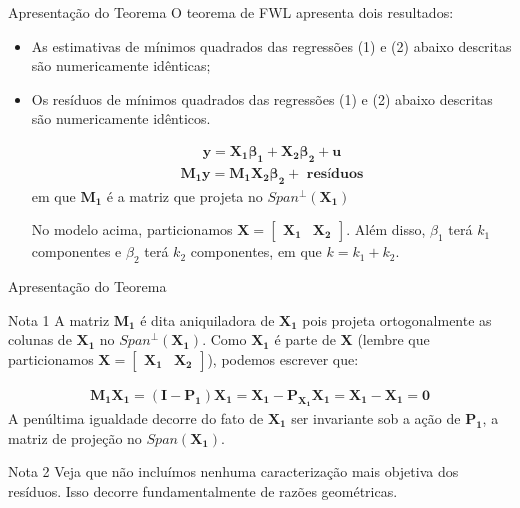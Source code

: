 \documentclass[11pt]{beamer}
\begin{document}
\begin{frame}{Apresentação do Teorema}
O teorema de FWL apresenta dois resultados:

\begin{itemize}

	\item As estimativas de m\'inimos quadrados das regress\~oes (1) e (2) abaixo descritas s\~ao numericamente id\^enticas;

	\item Os res\'iduos de m\'inimos quadrados das regress\~oes (1) e (2) abaixo descritas s\~ao numericamente id\^enticos.

\begin{align}
	\mathbf{y = X_1 \beta_1 + X_2 \beta_2 + u} 
\end{align} 
\begin{align}
	\mathbf{M_1y = M_1 X_2 \beta_2 +}  \textbf{ res\'iduos}
\end{align} 
em que $ \mathbf{M_1} $ \'e a matriz que projeta no $ Span^{\perp}(\mathbf{X_1}) $

No modelo acima, particionamos $ \mathbf{X} = \begin{bmatrix} \mathbf{X_1} & \mathbf{X_2} \end{bmatrix} $. Além disso, $ \beta_1 $ ter\'a $k_1$ componentes e $ \beta_2 $ ter\'a $k_2$ componentes, em que $ k = k_1 + k_2 $. 

\end{itemize}




\end{frame}

\begin{frame}{Apresentação do Teorema}
\begin{block}{Nota 1}
A matriz $ \mathbf{M_1} $ \'e dita aniquiladora de $ \mathbf{X_1} $ pois projeta ortogonalmente as colunas de $ \mathbf{X_1} $ no $ Span^{\perp}(\mathbf{X_1}) $.  Como $ \mathbf{X_1} $ \'e parte de $ \mathbf{X} $ (lembre que particionamos $ \mathbf{X} = \begin{bmatrix}  \mathbf{X_1} & \mathbf{X_2} \end{bmatrix}  $), podemos escrever que:

\begin{align*}
	\mathbf{M_1 X_1 = ( I - P_1) X_1 = X_1 - P_{X_1} X_1 = X_1 - X_1 = 0}
\end{align*}  
A pen\'ultima igualdade decorre do fato de $\mathbf{X_1} $ ser invariante sob a a\c{c}\~ao de $ \mathbf{P_1}$, a matriz de proje\c{c}\~ao no $Span(\mathbf{X_1})$.  
\end{block}
\begin{block}{Nota 2}
	Veja que n\~ao inclu\'imos nenhuma caracteriza\c{c}\~ao mais objetiva dos res\'iduos. Isso decorre fundamentalmente de raz\~oes geom\'etricas. 
\end{block}
\end{frame}
\end{document}
